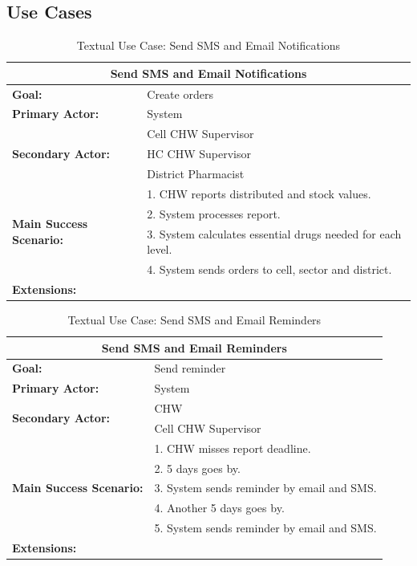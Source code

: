 \subsection{Use Cases}
\begin{table}
	\centering
	\begin{tabular}{|p{5cm}|p{7cm}|}
		\hline
		\multicolumn{2}{|c|}{\textbf{Send SMS and Email Notifications}}\\
		\hline
		\textbf{Goal:} & Create orders\\
		\hline
		\textbf{Primary Actor:} & System\\
		\hline
		\multirow{3}{*}{\textbf{Secondary Actor:}}	& Cell CHW Supervisor \\
																								& HC CHW Supervisor \\ 
																								& District Pharmacist \\
		\hline
		\multirow{4}{*}{\textbf{Main Success Scenario:}}	& 1. CHW reports distributed and stock values. \\
																											& 2. System processes report. \\
																											& 3. System calculates essential drugs needed for each level. \\
																											& 4. System sends orders to cell, sector and district. \\
		\hline
		\textbf{Extensions:} & \\
		\hline
	\end{tabular}
	\caption{Textual Use Case: Send SMS and Email Notifications}
	\label{tab:notifications}
\end{table}


\begin{table}
	\centering
	\begin{tabular}{|p{5cm}|p{7cm}|}
		\hline
		\multicolumn{2}{|c|}{\textbf{Send SMS and Email Reminders}}\\
		\hline
		\textbf{Goal:} & Send reminder \\
		\hline
		\textbf{Primary Actor:} & System \\
		\hline
		\multirow{2}{*}{\textbf{Secondary Actor:}}	& CHW \\
																								& Cell CHW Supervisor \\
		\hline
		\multirow{5}{*}{\textbf{Main Success Scenario:}}	& 1. CHW misses report deadline. \\
																											& 2. 5 days goes by. \\
																											& 3. System sends reminder by email and SMS. \\
																											& 4. Another 5 days goes by. \\
																											& 5. System sends reminder by email and SMS. \\
																											
		\hline
		\textbf{Extensions:} & \\
		\hline
	\end{tabular}
	\caption{Textual Use Case: Send SMS and Email Reminders}
	\label{tab:reminders}
\end{table}


